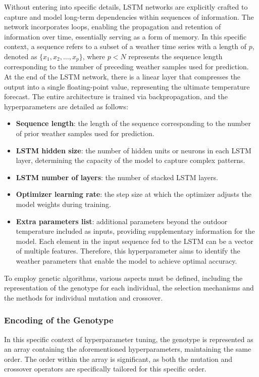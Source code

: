 Without entering into specific details, LSTM networks are explicitly crafted to capture and model long-term dependencies within sequences of information. The network incorporates loops, enabling the propagation and retention of information over time, essentially serving as a form of memory. In this specific context, a sequence refers to a subset of a weather time series with a length of $p$, denoted as $\{x_1, x_2, \ldots, x_p\}$, where $p < N$ represents the sequence length corresponding to the number of preceding weather samples used for prediction. At the end of the LSTM network, there is a linear layer that compresses the output into a single floating-point value, representing the ultimate temperature forecast. The entire architecture is trained via backpropagation, and the hyperparameters are detailed as follows:
\begin{itemize}
    \item \textbf{Sequence length}: the length of the sequence corresponding to the number of prior weather samples used for prediction.
    \item \textbf{LSTM hidden size}: the number of hidden units or neurons in each LSTM layer, determining the capacity of the model to capture complex patterns.
    \item \textbf{LSTM number of layers}: the number of stacked LSTM layers.
    \item \textbf{Optimizer learning rate}: the step size at which the optimizer adjusts the model weights during training.
    \item \textbf{Extra parameters list}: additional parameters beyond the outdoor temperature included as inputs, providing supplementary information for the model. Each element in the input sequence fed to the LSTM can be a vector of multiple features. Therefore, this hyperparameter aims to identify the weather parameters that enable the model to achieve optimal accuracy.
\end{itemize}

To employ genetic algorithms, various aspects must be defined, including the representation of the genotype for each individual, the selection mechanisms and the methods for individual mutation and crossover.


\subsubsection{Encoding of the Genotype}
In this specific context of hyperparameter tuning, the genotype is represented as an array containing the aforementioned hyperparameters, maintaining the same order. The order within the array is significant, as both the mutation and crossover operators are specifically tailored for this specific order.


